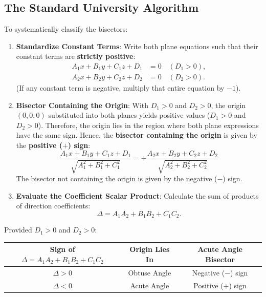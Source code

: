 \subsection{The Standard University Algorithm}
To systematically classify the bisectors:
\begin{enumerate}
    \item \textbf{Standardize Constant Terms}:
    Write both plane equations such that their constant terms are \textbf{strictly positive}:
    \begin{align}
        A_1 x + B_1 y + C_1 z + D_1 &= 0 \quad (D_1 > 0), \\
        A_2 x + B_2 y + C_2 z + D_2 &= 0 \quad (D_2 > 0).
    \end{align}
    (If any constant term is negative, multiply that entire equation by $-1$).
    \item \textbf{Bisector Containing the Origin}:
    With $D_1 > 0$ and $D_2 > 0$, the origin $(0,0,0)$ substituted into both planes yields positive values ($D_1 > 0$ and $D_2 > 0$).
    Therefore, the origin lies in the region where both plane expressions have the same sign.
    Hence, the \textbf{bisector containing the origin} is given by the \textbf{positive ($+$) sign}:
    \begin{equation}
        \boxed{\frac{A_1 x + B_1 y + C_1 z + D_1}{\sqrt{A_1^2 + B_1^2 + C_1^2}} = +\frac{A_2 x + B_2 y + C_2 z + D_2}{\sqrt{A_2^2 + B_2^2 + C_2^2}}}
    \end{equation}
    The bisector not containing the origin is given by the negative ($-$) sign.
    \item \textbf{Evaluate the Coefficient Scalar Product}:
    Calculate the sum of products of direction coefficients:
    \begin{equation}
        \Delta = A_1 A_2 + B_1 B_2 + C_1 C_2.
    \end{equation}
\end{enumerate}

\begin{theorembox}
Provided $D_1 > 0$ and $D_2 > 0$:
\begin{center}
\begin{tabular}{|c|c|c|}
\hline
\textbf{Sign of } $\Delta = A_1 A_2 + B_1 B_2 + C_1 C_2$ & \textbf{Origin Lies In} & \textbf{Acute Angle Bisector} \\
\hline
$\Delta > 0$ & Obtuse Angle & Negative ($-$) sign \\
$\Delta < 0$ & Acute Angle & Positive ($+$) sign \\
\hline
\end{tabular}
\end{center}
\end{theorembox}

